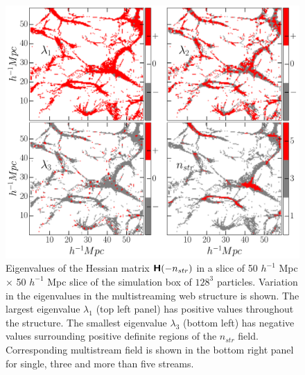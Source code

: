 \documentclass[fleqn,usenatbib,useAMS]{mnras}
\begin{document}
\begin{figure}
\begin{minipage}[t]{0.99\linewidth}
 \centering\includegraphics[height=14.cm]{fig8.pdf} 
\end{minipage}\hfill
\caption{Eigenvalues of the Hessian matrix $\textbf{\textsf{H}}(-n_{str})$ in a slice of 50 $h^{-1}$ Mpc $\times$ 50 $h^{-1}$ Mpc slice of the simulation box of $128^3$ particles. Variation in the eigenvalues in the multistreaming web structure is shown. The largest eigenvalue $\lambda_1$ (top left panel) has positive values throughout the structure. The smallest eigenvalue $\lambda_3$ (bottom left) has negative values surrounding positive definite regions of the $n_{str}$ field. Corresponding multistream field is shown in the bottom right panel for single, three and more than five streams.}
\label{fig:evals123}
\end{figure}
\end{document}
